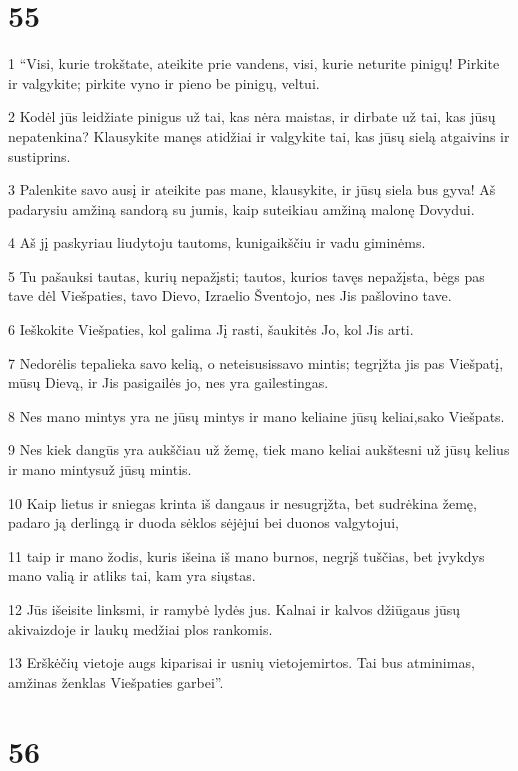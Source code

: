 \chapter{55}


\par 1 “Visi, kurie trokštate, ateikite prie vandens, visi, kurie neturite pinigų! Pirkite ir valgykite; pirkite vyno ir pieno be pinigų, veltui. 
\par 2 Kodėl jūs leidžiate pinigus už tai, kas nėra maistas, ir dirbate už tai, kas jūsų nepatenkina? Klausykite manęs atidžiai ir valgykite tai, kas jūsų sielą atgaivins ir sustiprins. 
\par 3 Palenkite savo ausį ir ateikite pas mane, klausykite, ir jūsų siela bus gyva! Aš padarysiu amžiną sandorą su jumis, kaip suteikiau amžiną malonę Dovydui. 
\par 4 Aš jį paskyriau liudytoju tautoms, kunigaikščiu ir vadu giminėms. 
\par 5 Tu pašauksi tautas, kurių nepažįsti; tautos, kurios tavęs nepažįsta, bėgs pas tave dėl Viešpaties, tavo Dievo, Izraelio Šventojo, nes Jis pašlovino tave. 
\par 6 Ieškokite Viešpaties, kol galima Jį rasti, šaukitės Jo, kol Jis arti. 
\par 7 Nedorėlis tepalieka savo kelią, o neteisusis­savo mintis; tegrįžta jis pas Viešpatį, mūsų Dievą, ir Jis pasigailės jo, nes yra gailestingas. 
\par 8 Nes mano mintys yra ne jūsų mintys ir mano keliai­ne jūsų keliai,­sako Viešpats.­ 
\par 9 Nes kiek dangūs yra aukščiau už žemę, tiek mano keliai aukštesni už jūsų kelius ir mano mintys­už jūsų mintis. 
\par 10 Kaip lietus ir sniegas krinta iš dangaus ir nesugrįžta, bet sudrėkina žemę, padaro ją derlingą ir duoda sėklos sėjėjui bei duonos valgytojui, 
\par 11 taip ir mano žodis, kuris išeina iš mano burnos, negrįš tuščias, bet įvykdys mano valią ir atliks tai, kam yra siųstas. 
\par 12 Jūs išeisite linksmi, ir ramybė lydės jus. Kalnai ir kalvos džiūgaus jūsų akivaizdoje ir laukų medžiai plos rankomis. 
\par 13 Erškėčių vietoje augs kiparisai ir usnių vietoje­mirtos. Tai bus atminimas, amžinas ženklas Viešpaties garbei”.



\chapter{56}


